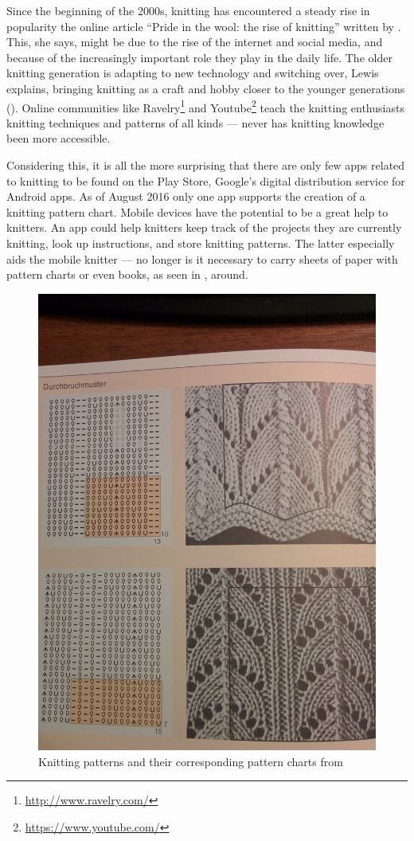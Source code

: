 Since the beginning of the 2000s, knitting has encountered a steady rise in popularity the online article ``Pride in the wool: the rise of knitting'' written by \cite{lewis_rise_of_knitting}. This, she says, might be due to the rise of the internet and social media, and because of the increasingly important role they play in the daily life. The older knitting generation is adapting to new technology and switching over, Lewis explains, bringing knitting as a craft and hobby closer to the younger generations (\cite{lewis_rise_of_knitting}). Online communities like Ravelry\footnote{\url{http://www.ravelry.com/}} and Youtube\footnote{\url{https://www.youtube.com/}} teach the knitting enthusiasts knitting techniques and patterns of all kinds --- never has knitting knowledge been more accessible.

Considering this, it is all the more surprising that there are only few apps related to knitting to be found on the Play Store, Google's digital distribution service for Android apps. As of August 2016 only one app supports the creation of a knitting pattern chart. Mobile devices have the potential to be a great help to knitters. An app could help knitters keep track of the projects they are currently knitting, look up instructions, and store knitting patterns. The latter especially aids the mobile knitter --- no longer is it necessary to carry sheets of paper with pattern charts or even books, as seen in , around.

\begin{figure}[H]
	\centering
    \includegraphics[width=.45\textwidth]{images/knitting_pattern_chart_book.jpg}
   \caption[{Knitting patterns and their corresponding pattern charts \protect{}}]{Knitting patterns and their corresponding pattern charts from \protect\cite[p142]{Natter1983}}
   \label{fig:knitting_book}
\end{figure}

